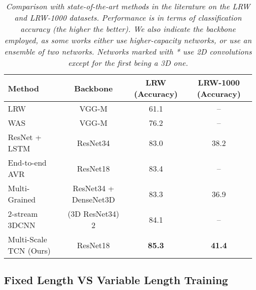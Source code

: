 \documentclass{article}
\begin{document}
\begin{table*}
\begin{center}
\begin{tabular}{|l|c|c|c|}
\hline
Method & Backbone & LRW (Accuracy) & LRW-1000 (Accuracy) \\
\hline
LRW \cite{chung16} & VGG-M & 61.1 & -- \\
WAS \cite{chung16b} & VGG-M & 76.2 & --\\
ResNet + LSTM \cite{stafylakis17} & ResNet34 & 83.0 & 38.2\footnotemark\\
End-to-end AVR \cite{petridis18} & ResNet18 & 83.4\footnotemark & --\\
Multi-Grained \cite{wang2019} & ResNet34 + DenseNet3D & 83.3 & 36.9 \\
2-stream 3DCNN \cite{weng19} & (3D ResNet34) 2 & 84.1 & --\\
\hline
Multi-Scale TCN (Ours) & ResNet18 & \textbf{85.3} & \textbf{41.4} \\
\hline
\end{tabular}
\vspace{-2mm}
\end{center}
\caption{\it Comparison with state-of-the-art methods in the literature on the LRW and LRW-1000 datasets. Performance is in terms of classification accuracy (the higher the better). We also indicate the backbone employed, as some works either use higher-capacity networks, or use an ensemble of two networks. Networks marked with * use 2D convolutions except for the first being a 3D one.}
\label{tab:sota_visual}
\end{table*}




\subsection{Fixed Length VS Variable Length Training}
\label{ssec:variable_lengthResults}
\end{document}
